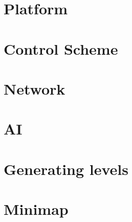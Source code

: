 \chapter{Platform}


\chapter{Control Scheme}



\chapter{Network}


\chapter{AI}


\chapter{Generating levels}


\chapter{Minimap}

